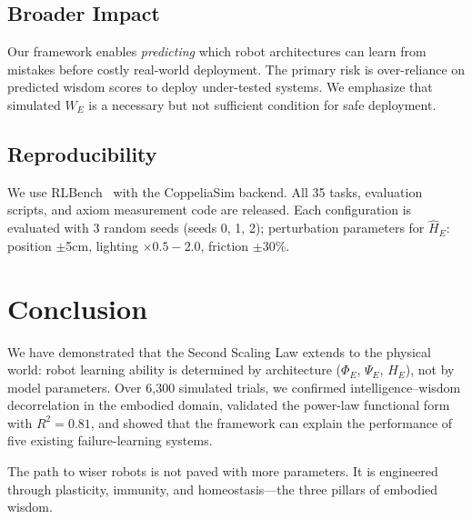 \documentclass{article}
\begin{document}
\subsection{Broader Impact}

Our framework enables \emph{predicting} which robot architectures can learn from mistakes before costly real-world deployment.  The primary risk is over-reliance on predicted wisdom scores to deploy under-tested systems.  We emphasize that simulated $W_E$ is a necessary but not sufficient condition for safe deployment.

\subsection{Reproducibility}

We use RLBench~\citep{james2020rlbench} with the CoppeliaSim backend.  All 35 tasks, evaluation scripts, and axiom measurement code are released.  Each configuration is evaluated with 3 random seeds (seeds 0, 1, 2); perturbation parameters for $\hat{H}_E$: position $\pm$5cm, lighting $\times 0.5{-}2.0$, friction $\pm 30\%$.

\section{Conclusion}
\label{sec:conclusion}

We have demonstrated that the Second Scaling Law extends to the physical world: robot learning ability is determined by architecture ($\Phi_E$, $\Psi_E$, $H_E$), not by model parameters.
Over 6{,}300 simulated trials, we confirmed intelligence--wisdom decorrelation in the embodied domain, validated the power-law functional form with $R^2 = 0.81$, and showed that the framework can explain the performance of five existing failure-learning systems.

The path to wiser robots is not paved with more parameters.
It is engineered through plasticity, immunity, and homeostasis---the three pillars of embodied wisdom.



\end{document}
